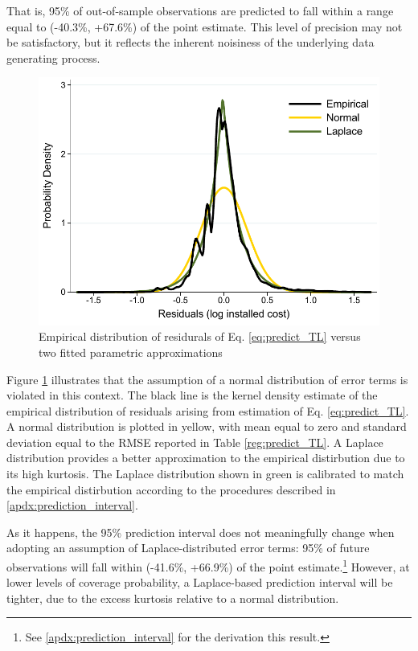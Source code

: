 \documentclass[preprint,12pt,authoryear]{elsarticle}
\begin{document}
That is, 95\% of out-of-sample observations are predicted to fall within a range equal to (-40.3\%, +67.6\%) of the point estimate. This level of precision may not be satisfactory, but it reflects the inherent noisiness of the underlying data generating process.

\begin{figure}[t]
\centering
\includegraphics[width=\textwidth]{graphs/CA_SGIP/laplace_vs_normal.pdf}
\caption{Empirical distribution of residurals of Eq. \ref{eq:predict_TL} versus two fitted parametric approximations}\label{fig:e_dists}
\end{figure}

Figure \ref{fig:e_dists} illustrates that the assumption of a normal distribution of error terms is violated in this context. The black line is the kernel density estimate of the empirical distribution of residuals arising from estimation of Eq. \ref{eq:predict_TL}. A normal distribution is plotted in yellow, with mean equal to zero and standard deviation equal to the RMSE reported in Table \ref{reg:predict_TL}. A Laplace distribution provides a better approximation to the empirical distirbution due to its high kurtosis. The Laplace distribution shown in green is calibrated to match the empirical distirbution according to the procedures described in \ref{apdx:prediction_interval}.

As it happens, the 95\% prediction interval does not meaningfully change when adopting an assumption of Laplace-distributed error terms: 95\% of future observations will fall within (-41.6\%, +66.9\%) of the point estimate.\footnote{See \ref{apdx:prediction_interval} for the derivation this result.} However, at lower levels of coverage probability, a Laplace-based prediction interval will be tighter, due to the excess kurtosis relative to a normal distribution.
\end{document}

